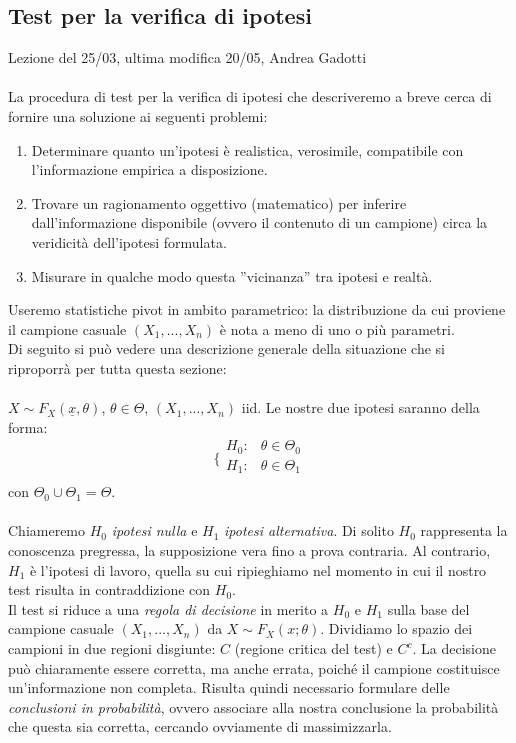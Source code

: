 

\subsection{Test per la verifica di ipotesi}
Lezione del 25/03, ultima modifica 20/05, Andrea Gadotti
\\ \\

La procedura di test per la verifica di ipotesi che descriveremo a breve cerca di fornire una soluzione ai seguenti problemi:
\begin{enumerate}
\item Determinare quanto un'ipotesi è realistica, verosimile, compatibile con l'informazione empirica a disposizione.
\item Trovare un ragionamento oggettivo (matematico) per inferire dall'informazione disponibile (ovvero il contenuto di un campione) circa la veridicità dell'ipotesi formulata.
\item Misurare in qualche modo questa ''vicinanza'' tra ipotesi e realtà.
\end{enumerate}
Useremo statistiche pivot in ambito parametrico: la distribuzione da cui proviene il campione casuale $(X_1,...,X_n)$ è nota a meno di uno o più parametri.\\
Di seguito si può vedere una descrizione generale della situazione che si riproporrà per tutta questa sezione:\\
\\
$X \sim F_X(\underline{x},\theta)$, $\theta \in \Theta$, $(X_1,...,X_n)$ iid. Le nostre due ipotesi saranno della forma:
$$\bigg \{
\begin{array}{rl}
H_0: & \theta \in \Theta_0 \\
H_1: & \theta \in \Theta_1 \\
\end{array}
$$
con $\Theta_0 \cup \Theta_1 = \Theta$.\\
\\
Chiameremo $H_0$ \textit{ipotesi nulla} e $H_1$ \textit{ipotesi alternativa}. Di solito $H_0$ rappresenta la conoscenza pregressa, la supposizione vera fino a prova contraria. Al contrario, $H_1$ è l'ipotesi di lavoro, quella su cui ripieghiamo nel momento in cui il nostro test risulta in contraddizione con $H_0$.\\
Il test si riduce a una \textit{regola di decisione} in merito a $H_0$ e $H_1$ sulla base del campione casuale $(X_1,...,X_n)$ da $X \sim F_X (x;\theta)$. Dividiamo lo spazio dei campioni in due regioni disgiunte: $C$ (regione critica del test) e $C^c$. La decisione può chiaramente essere corretta, ma anche errata, poiché il campione costituisce un'informazione non completa. Risulta quindi necessario formulare delle \textit{conclusioni in probabilità}, ovvero associare alla nostra conclusione la probabilità che questa sia corretta, cercando ovviamente di massimizzarla.\\
